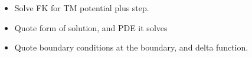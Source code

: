 \begin{itemize}
  \item {Solve FK for TM potential plus step. }
  \item Quote form of solution, and PDE it solves

  \item Quote boundary conditions at the boundary, and delta function.  



\end{itemize}
